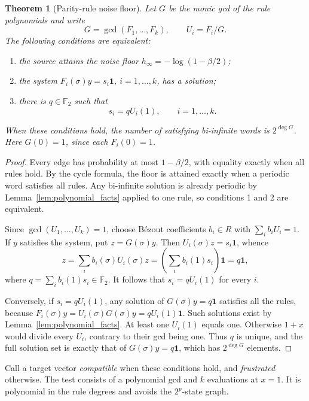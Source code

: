\documentclass[11pt,a4paper]{article}
\newtheorem{theorem}{Theorem}
\begin{document}
\begin{theorem}[Parity-rule noise floor]
\label{thm:parity_floor}
Let $G$ be the monic gcd of the rule polynomials and write
\[
    G=\gcd(F_1,\ldots,F_k),
    \qquad U_i=F_i/G.
\]
The following conditions are equivalent:
\begin{enumerate}
    \item the source attains the noise floor
          $h_\infty=-\log(1-\beta/2)$;
    \item the system
          $F_i(\sigma)y=s_i\mathbf1$, $i=1,\ldots,k$, has a solution;
    \item there is $q\in\mathbb F_2$ such that
          \begin{equation}
          \label{eq:parity_criterion}
              s_i=qU_i(1),\qquad i=1,\ldots,k.
          \end{equation}
\end{enumerate}
When these conditions hold, the number of satisfying bi-infinite words
is $2^{\deg G}$.  Here $G(0)=1$, since each $F_i(0)=1$.
\end{theorem}

\begin{proof}
Every edge has probability at most $1-\beta/2$, with equality
exactly when all rules hold.  By the cycle formula, the floor is
attained exactly when a periodic word satisfies all rules.  Any
bi-infinite solution is already periodic by
Lemma~\ref{lem:polynomial_facts} applied to one rule, so conditions
1 and 2 are equivalent.

Since $\gcd(U_1,\ldots,U_k)=1$, choose B\'ezout coefficients
$b_i\in R$ with $\sum_i b_iU_i=1$.  If $y$ satisfies the system,
put $z=G(\sigma)y$.  Then $U_i(\sigma)z=s_i\mathbf1$, whence
\[
    z=\sum_i b_i(\sigma)U_i(\sigma)z
      =\left(\sum_i b_i(1)s_i\right)\mathbf1=q\mathbf1,
\]
where $q=\sum_i b_i(1)s_i\in\mathbb F_2$.
It follows that $s_i=qU_i(1)$ for every $i$.

Conversely, if $s_i=qU_i(1)$, any solution of
$G(\sigma)y=q\mathbf1$ satisfies all the rules, because
$F_i(\sigma)y=U_i(\sigma)G(\sigma)y=qU_i(1)\mathbf1$.
Such solutions exist by Lemma~\ref{lem:polynomial_facts}.
At least one $U_i(1)$ equals one.  Otherwise $1+x$ would divide
every $U_i$, contrary to their gcd being one.  Thus $q$ is unique,
and the full solution set is exactly that of $G(\sigma)y=q\mathbf1$,
which has $2^{\deg G}$ elements.
\end{proof}

Call a target vector \emph{compatible} when these conditions hold,
and \emph{frustrated} otherwise.  The test consists of a polynomial
gcd and $k$ evaluations at $x=1$.
It is polynomial in the rule degrees and avoids the $2^p$-state graph.
\end{document}
